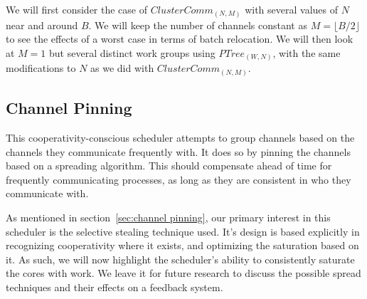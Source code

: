 We will first consider the case of $ClusterComm_{(N,M)}$ with several values of
$N$ near and around $B$. We will keep the number of channels constant as 
$M=\lfloor B/2 \rfloor$ to see the effects of a worst case in terms of batch 
relocation. We will then look at $M=1$ but several distinct work groups using
$PTree_{(W,N)}$, with the same modifications to $N$ as we did with 
$ClusterComm_{(N,M)}$.


\subsection{Channel Pinning}\label{sec:results-channelpinner}

This cooperativity-conscious scheduler attempts to group channels based on the 
channels they communicate frequently with. It does so by pinning the channels
based on a spreading algorithm. This should compensate ahead of time for 
frequently communicating processes, as long as they are consistent in who they
communicate with. 

As mentioned in section~\ref{sec:channel pinning}, our primary interest in this 
scheduler is the selective stealing technique used. It's design is based 
explicitly in recognizing cooperativity where it exists, and optimizing the
saturation based on it. As such, we will now highlight the scheduler's ability to 
consistently saturate the cores with work. We leave it for future research to 
discuss the possible spread techniques and their effects on a feedback system.


